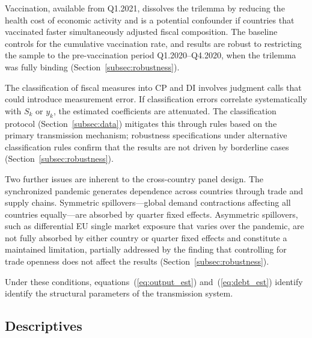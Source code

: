 \documentclass[12pt, a4paper]{article}
\begin{document}
Vaccination, available from Q1.2021, dissolves the trilemma by reducing the health
cost of economic activity and is a potential confounder if countries that vaccinated
faster simultaneously adjusted fiscal composition. The baseline controls for the
cumulative vaccination rate, and results are robust to restricting the sample to the
pre-vaccination period Q1.2020--Q4.2020, when the trilemma was fully binding
(Section~\ref{subsec:robustness}).

The classification of fiscal measures into CP and DI involves judgment calls that
could introduce measurement error. If classification errors correlate systematically
with $S_k$ or $y_k$, the estimated coefficients are attenuated. The classification
protocol (Section~\ref{subsec:data}) mitigates this through rules based on the primary
transmission mechanism; robustness specifications under alternative classification
rules confirm that the results are not driven by borderline cases
(Section~\ref{subsec:robustness}).

Two further issues are inherent to the cross-country panel design. The synchronized
pandemic generates dependence across countries through trade and supply chains.
Symmetric spillovers---global demand contractions affecting all countries
equally---are absorbed by quarter fixed effects. Asymmetric spillovers, such as
differential EU single market exposure that varies over the pandemic, are not fully
absorbed by either country or quarter fixed effects and constitute a maintained
limitation, partially addressed by the finding that controlling for trade openness does not affect the results (Section~\ref{subsec:robustness}).

Under these conditions, equations~(\ref{eq:output_est}) and~(\ref{eq:debt_est})
identify identify the structural parameters of the transmission system.


\subsection{Descriptives}
\end{document}
